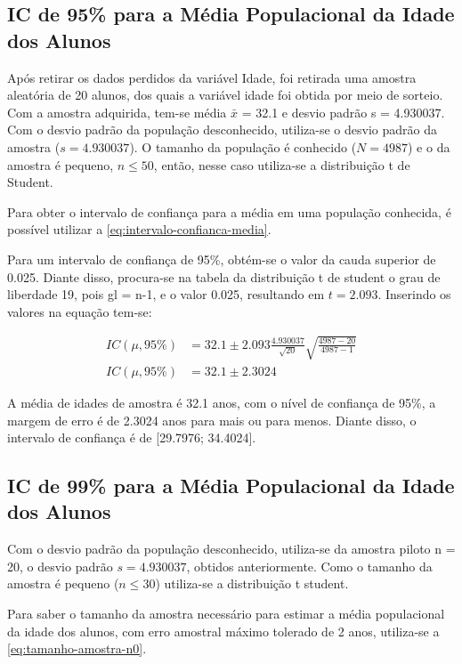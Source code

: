 \subsection{IC de 95\% para a Média Populacional da Idade dos Alunos}
\label{sub:1a}
	
	Após retirar os dados perdidos da variável Idade, foi retirada uma
	amostra aleatória de 20 alunos, dos quais a variável idade foi obtida por meio de sorteio. Com a amostra
	adquirida, tem-se média $\bar{x}$ = \num{32,1} e desvio padrão s = \num{4,930037}.
	Com o desvio padrão da população desconhecido, utiliza-se o desvio
	padrão da amostra ($s = \num{4,930037}$).  O tamanho da população é conhecido ($N
	= 4987$) e o da amostra é pequeno, $n \leq 50$, então, nesse caso utiliza-se
	a distribuição t de Student.

	Para obter o intervalo de confiança para a média em uma população
	conhecida, é possível utilizar a \autoref{eq:intervalo-confianca-media}.

	Para um intervalo de confiança de 95\%, obtém-se o valor da cauda
	superior de \num{0,025}. Diante disso, procura-se na tabela da distribuição
	t de student o grau de liberdade 19, pois gl = n-1, e o valor \num{0,025},
	resultando em $t = \num{2,093}$. Inserindo os valores na equação
	tem-se:

	\begin{align*}
		IC (\mu, 95\%) &= \num{32,1} \pm \num{2,093} \frac{\num{4,930037}}{\sqrt{20}} \sqrt{\frac{4987 - 20}{4987 - 1}} \\
		IC (\mu, 95\%) &= \num{32,1} \pm \num{2,3024}
	\end{align*}

	A média de idades de amostra é \num{32,1} anos, com o nível de confiança de
	95\%, a margem de erro é de \num{2,3024} anos para mais ou para menos. Diante
	disso, o intervalo de confiança é de [\num{29,7976}; \num{34,4024}].

\subsection{IC de 99\% para a Média Populacional da Idade dos Alunos}

	Com o desvio padrão da população desconhecido, utiliza-se da amostra
	piloto n = 20, o desvio padrão $s = \num{4,930037}$, obtidos anteriormente. Como o
	tamanho da amostra é pequeno ($n \leq 30$) utiliza-se a distribuição t student.

	Para saber o tamanho da amostra necessário para estimar a média
	populacional da idade dos alunos, com erro amostral máximo tolerado de 2
	anos, utiliza-se a \autoref{eq:tamanho-amostra-n0}.

